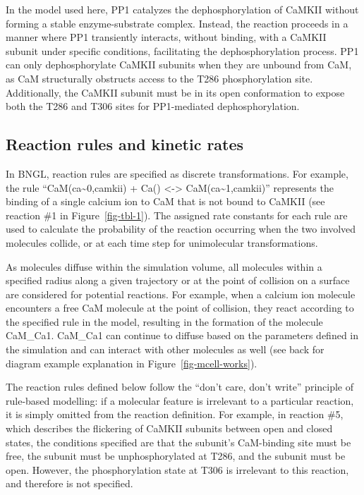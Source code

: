 \documentclass[
  11pt,
  letterpaper,
]{scrreprt}
\begin{document}
In the model used here, PP1 catalyzes the dephosphorylation of CaMKII
without forming a stable enzyme-substrate complex. Instead, the reaction
proceeds in a manner where PP1 transiently interacts, without binding,
with a CaMKII subunit under specific conditions, facilitating the
dephosphorylation process. PP1 can only dephosphorylate CaMKII subunits
when they are unbound from CaM, as CaM structurally obstructs access to
the T286 phosphorylation site. Additionally, the CaMKII subunit must be
in its open conformation to expose both the T286 and T306 sites for
PP1-mediated dephosphorylation.

\subsection{Reaction rules and kinetic
rates}\label{reaction-rules-and-kinetic-rates}

In BNGL, reaction rules are specified as discrete transformations. For
example, the rule ``CaM(ca\textasciitilde0,camkii) + Ca()
\textless-\textgreater{} CaM(ca\textasciitilde1,camkii)'' represents the
binding of a single calcium ion to CaM that is not bound to CaMKII (see
reaction \#1 in Figure~\ref{fig-tbl-1}). The assigned rate constants for
each rule are used to calculate the probability of the reaction
occurring when the two involved molecules collide, or at each time step
for unimolecular transformations.

As molecules diffuse within the simulation volume, all molecules within
a specified radius along a given trajectory or at the point of collision
on a surface are considered for potential reactions. For example, when a
calcium ion molecule encounters a free CaM molecule at the point of
collision, they react according to the specified rule in the model,
resulting in the formation of the molecule CaM\_Ca1. CaM\_Ca1 can
continue to diffuse based on the parameters defined in the simulation
and can interact with other molecules as well (see back for diagram
example explanation in Figure~\ref{fig-mcell-works}).

The reaction rules defined below follow the ``don't care, don't write''
principle of rule-based modelling: if a molecular feature is irrelevant
to a particular reaction, it is simply omitted from the reaction
definition. For example, in reaction \#5, which describes the flickering
of CaMKII subunits between open and closed states, the conditions
specified are that the subunit's CaM-binding site must be free, the
subunit must be unphosphorylated at T286, and the subunit must be open.
However, the phosphorylation state at T306 is irrelevant to this
reaction, and therefore is not specified.
\end{document}
